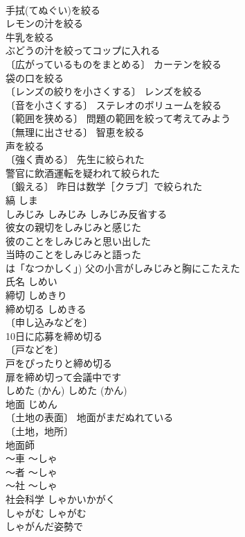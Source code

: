\documentclass[8pt]{extreport}
\begin{document}
\begin{CJK}{UTF8}{min}
\\	手拭(てぬぐい)を絞る 
\\	レモンの汁を絞る 
\\	牛乳を絞る 
\\	ぶどうの汁を絞ってコップに入れる 
\\	〔広がっているものをまとめる〕 カーテンを絞る 
\\	袋の口を絞る 
\\	〔レンズの絞りを小さくする〕 レンズを絞る 
\\	〔音を小さくする〕 ステレオのボリュームを絞る 
\\	〔範囲を狭める〕 問題の範囲を絞って考えてみよう 
\\	〔無理に出させる〕 智恵を絞る 
\\	声を絞る 
\\	〔強く責める〕 先生に絞られた 
\\	警官に飲酒運転を疑われて絞られた 
\\	〔鍛える〕 昨日は数学［クラブ］で絞られた 
\\	縞	しま	
\\	しみじみ	しみじみ	しみじみ反省する 
\\	彼女の親切をしみじみと感じた 
\\	彼のことをしみじみと思い出した 
\\	当時のことをしみじみと語った 
\\	は「なつかしく」) 父の小言がしみじみと胸にこたえた 
\\	氏名	しめい	
\\	締切	しめきり	
\\	締め切る	しめきる	
\\	〔申し込みなどを〕
\\	10日に応募を締め切る 
\\	〔戸などを〕
\\	戸をぴったりと締め切る 
\\	扉を締め切って会議中です 
\\	しめた (かん)	しめた (かん)	
\\	地面	じめん	
\\	〔土地の表面〕 地面がまだぬれている 
\\	〔土地，地所〕
\\	地面師 
\\	～車	～しゃ	
\\	～者	～しゃ	
\\	～社	～しゃ	
\\	社会科学	しゃかいかがく	
\\	しゃがむ	しゃがむ	
\\	しゃがんだ姿勢で 

\end{CJK}
\end{document}
